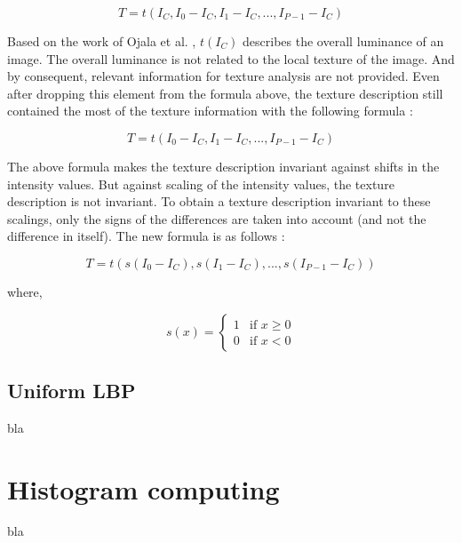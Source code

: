 \begin{equation}
   T = t(I_C, I_0 - I_C, I_1 - I_C, ..., I_{P-1} - I_C)
\end{equation}

\vspace{\baselineskip}
\noindent Based on the work of Ojala et al. \cite{OJA96}, $ t(I_C) $ describes the overall luminance of an image. The overall luminance is not related to the local texture of the image. And by consequent, relevant information for texture analysis are not provided. Even after dropping this element from the formula above, the texture description still contained the most of the texture information with the following formula \cite{GAN08}:
\newline

\begin{equation}
   T = t(I_0 - I_C, I_1 - I_C, ..., I_{P-1} - I_C)
\end{equation}

\vspace{\baselineskip}
\noindent The above formula makes the texture description invariant against shifts in the intensity values. But against scaling of the intensity values, the texture description is not invariant. To obtain a texture description invariant to these scalings, only the signs of the differences are taken into account (and not the difference in itself). The new formula is as follows \cite{GAN08}:
\newline

\begin{equation}
   T = t(s(I_0 - I_C), s(I_1 - I_C), ..., s(I_{P-1} - I_C))
\end{equation}

\noindent where,
\newline

\begin{equation}
s(x) = \left\{
    \begin{array}{ll}
        1 & \mbox{if } x\geq0 \\
        0 & \mbox{if } x < 0
    \end{array}
\right.
\end{equation}

\subsection{Uniform LBP}

\vspace{\baselineskip}
\noindent bla
\newline

\section{Histogram computing}

\vspace{\baselineskip}
\noindent bla
\newline
